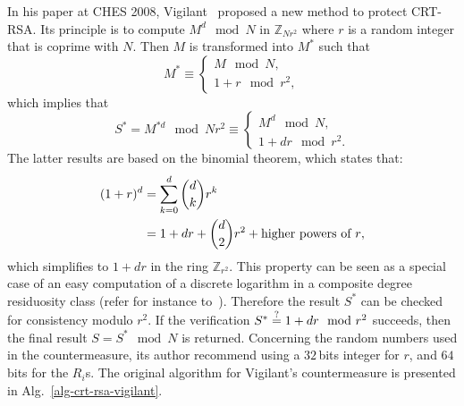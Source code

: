 \documentclass[10pt]{article}
\theoremstyle{definition}
\theoremstyle{theorem}
\newcommand{\Z}{\mathbb{Z}}
\begin{document}
In his paper at CHES 2008, Vigilant~\cite{DBLP:conf/ches/Vigilant08} proposed a new method to protect CRT-RSA.
Its principle is to compute $M^d \mod N$ in $\Z_{Nr^2}$ where $r$ is a random integer that is coprime with $N$.
Then $M$ is transformed into $M^*$ such that
\[ M^* \equiv
\begin{cases}
  M \mod N,\\
  1+r \mod r^2,
\end{cases}
\]
which implies that
\[ S^* = M^{*d} \mod Nr^2 \equiv
\begin{cases}
  M^d \mod N,\\
  1+dr \mod r^2.
\end{cases}
\]
The latter results are based on the binomial theorem, which states that:
\begin{align}
(1+r)^d
&= \sum_{k=0}^d {d \choose k}r^k \notag\\
&= 1+dr + {d \choose 2} r^2 + \text{higher powers of $r$},
\end{align}
which simplifies to $1+dr$ in the ring $\Z_{r^2}$.
This property can be seen as a special case of an easy computation of a discrete logarithm in a composite degree residuosity class
(refer for instance to~\cite{DBLP:conf/eurocrypt/Paillier99}).
Therefore the result $S^*$ can be checked for consistency modulo $r^2$.
If the verification $S^* \stackrel{{\smaller ?}}{=} 1+dr \mod r^2$ succeeds, then the final result $S = S^* \mod N$ is returned.
Concerning the random numbers used in the countermeasure, its author recommend using a $32$\,bits integer for $r$, and $64$\,bits for the $R_i$s.
The original algorithm for Vigilant's countermeasure is presented in Alg.~\ref{alg-crt-rsa-vigilant}.
\end{document}
